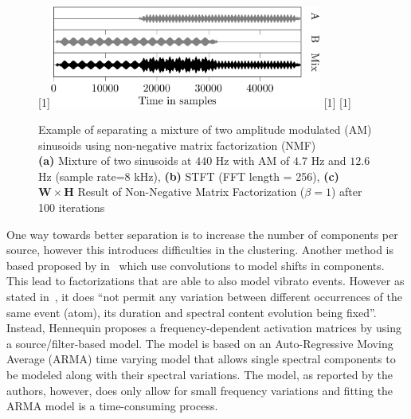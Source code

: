 \begin{figure}[H]
\centering
{}%
[1\textwidth]{\includegraphics[width=0.8\textwidth]{Chapters/05_Separation_Known/figures/Timepdf-crop.pdf}}%
\hspace{0.2\textwidth} %
[1\textwidth]{}%
\hspace{0.3\textwidth} %
[1\textwidth]{}%
\caption{Example of separating a mixture of two amplitude modulated (AM) sinusoids using non-negative matrix factorization (NMF)\\ \textbf{(a)} Mixture of two sinusoids at $440$ Hz with AM of $4.7$ Hz and $12.6$ Hz (sample rate=$8$ kHz), \textbf{(b)} STFT (FFT length = 256), \textbf{(c)} $\mathbf{W} \times \mathbf{H}$ Result of Non-Negative Matrix Factorization ($\beta = 1$) after 100 iterations}
\label{fig:am_tensor_nmf}
\end{figure}

One way towards better separation is to increase the number of components per source, however this introduces difficulties in the clustering.
Another method is based proposed by in~\cite{smaragdis04, fitzgerald05s, jaiswal13, rodriguezserrano16} which use convolutions to model shifts in components.
This lead to factorizations that are able to also model vibrato events.
However as stated in~\cite{hennequin11}, it does ``not  permit  any variation  between  different  occurrences  of  the  same  event (atom), its duration and spectral content evolution being fixed''. 
Instead, Hennequin proposes a frequency-dependent activation matrices by using a source/filter-based model.
The model is based on an Auto-Regressive Moving Average (ARMA) time varying model that allows single spectral components to be modeled along with their spectral variations. 
The model, as reported by the authors, however, does only allow for small frequency variations and fitting the ARMA model is a time-consuming process.

